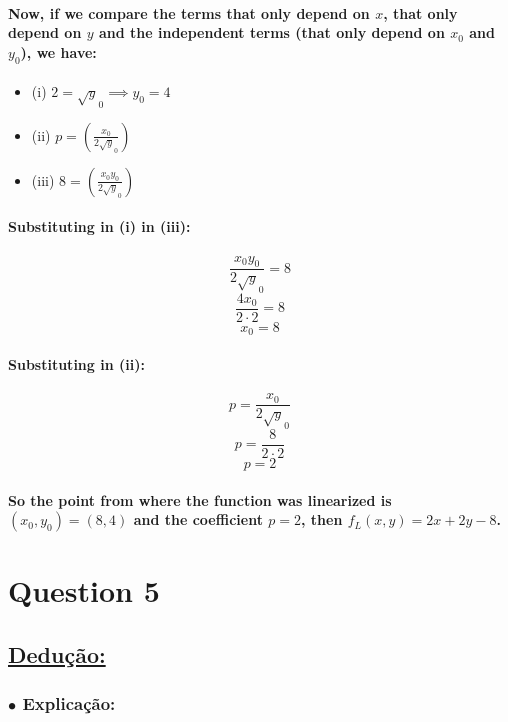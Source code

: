 \documentclass[a4paper]{article}    %
\begin{document}
    \paragraph{Now, if we compare the terms that only depend on $x$, that only depend on $y$ and the independent terms (that only depend on $x_0$ and $y_0$), we have:}
\begin{itemize}
    \item (i)   $ 2 = \sqrt y_0 \implies \boxed{y_0 = 4}$ 
    \item (ii)  $ p = \left(\frac{x_0}{2\sqrt y_0}\right) $
    \item (iii) $ 8 = \left(\frac{x_0 y_0}{2\sqrt y_0}\right) $
\end{itemize}

\paragraph{Substituting in (i) in (iii):}
    \[\frac{x_0 y_0}{2\sqrt y_0} = 8\]
    \[\frac{4 x_0}{2\cdot2} = 8\]
    \[\boxed{x_0 = 8}\]

\paragraph{Substituting in (ii):}
    \[p = \frac{x_0}{2\sqrt y_0}\]
    \[p = \frac{8}{2\cdot2}\]
    \[\boxed{p = 2}\]

    \paragraph{So the point from where the function was linearized is $(x_0,y_0) = (8,4)$ and the coefficient $p = 2$, then $f_L(x,y) = 2x + 2y -8$.}

\newpage
 
\section*{Question 5}
\addtocounter{section}{1}

\subsection*{\underline{Dedução:}}

\subsubsection*{\hspace{5mm}$\bullet$ Explicação:}
\end{document}
